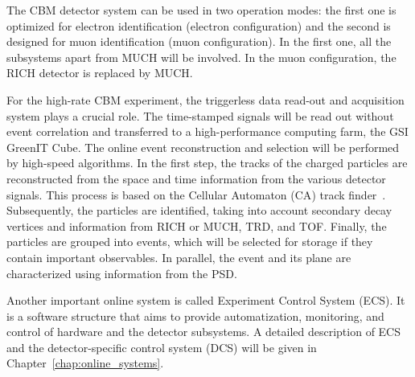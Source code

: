 The CBM detector system can be used in two operation modes: the first one is optimized for electron identification (electron configuration) and the second is designed for muon identification (muon configuration). In the first one, all the subsystems apart from MUCH will be involved. In the muon configuration, the \gls{RICH} detector is replaced by \gls{MUCH}.

For the high-rate CBM experiment, the triggerless data read-out and acquisition system plays a crucial role. The time-stamped signals will be read out without event correlation and transferred to a high-performance computing farm, the GSI GreenIT Cube. The online event reconstruction and selection will be performed by high-speed algorithms. In the first step, the tracks of the charged particles are reconstructed from the space and time information from the various detector signals. This process is based on the Cellular Automaton (\gls{CA}) track finder~\cite{CA}. Subsequently, the particles are identified, taking into account secondary decay vertices and information from \gls{RICH} or \gls{MUCH}, \gls{TRD}, and \gls{TOF}. Finally, the particles are grouped into events, which will be selected for storage if they contain important observables. In parallel, the event and its plane are characterized using information from the PSD.

Another important online system is called Experiment Control System (\gls{ECS}). It is a software structure that aims to provide automatization, monitoring, and control of hardware and the detector subsystems. A detailed description of \gls{ECS} and the detector-specific control system (\gls{DCS}) will be given in Chapter~\ref{chap:online_systems}.



